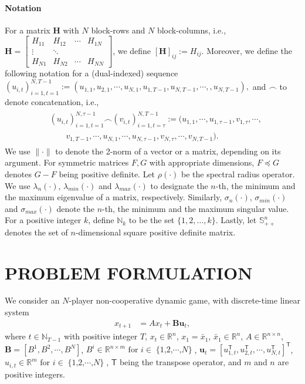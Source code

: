 \documentclass[letterpaper, 10 pt, conference]{ieeeconf}  %
\newcommand{\transpose}{\mathsf{T}}
\DeclareMathOperator{\Nplayers}{\{1,2,\cdots,\textit{N}\}}
\begin{document}
\paragraph*{Notation}
For a matrix $\mathbf{H}$ with $N$ block-rows and $N$ block-columns, i.e.,
    $\mathbf{H} = 
    \begin{bmatrix}
        H_{11} & H_{12} &\cdots & H_{1N}\\
        \vdots& \ddots\\
        H_{N1} & H_{N2} & \cdots &H_{NN}
    \end{bmatrix}$,
we define
    $[\mathbf{H}]_{ij} := H_{ij}$.
Moreover, we define the following notation for a (dual-indexed) sequence
$(u_{i,t})_{i=1,t=1}^{N,T-1} := (u_{1,1},u_{2,1},\cdots,u_{N,1}, u_{1,T-1},u_{N,T-1},\cdots,,u_{N,T-1}),
$
and $\frown$ to denote concatenation, i.e.,
\begin{align*}
    \begin{split}
    &(u_{i,t})_{i=1,t=1}^{N,\tau-1} \frown (v_{i,t})_{i=1,t=\tau}^{N,T-1}:=(u_{1,1},\cdots,u_{1,\tau-1},v_{1,\tau},\cdots,\\
    &\qquad v_{1,T-1},\cdots, u_{N,1},\cdots,u_{N,\tau-1},v_{N,\tau},\cdots,v_{N,T-1} ).
    \end{split}
\end{align*}
We use $\|\cdot\|$ to denote the 2-norm of a vector or a matrix, depending on its argument. For symmetric matrices $F,G$ with appropriate dimensions, $F \preceq G$ denotes $G-F$ being positive definite. Let $\rho(\cdot)$ be the spectral radius operator. We use $\lambda_{n}(\cdot)$, $\lambda_{min}(\cdot)$ and $\lambda_{max}(\cdot)$ to designate the $n$-th, the minimum and the maximum eigenvalue of a matrix, respectively. Similarly, $\sigma_{n}(\cdot)$, $\sigma_{min}(\cdot)$ and $\sigma_{max}(\cdot)$ denote the $n$-th, the minimum and the maximum singular value. For a positive integer $k$, define $\mathbb{N}_k$ to be the set $\{1,2,\dots,k\}$. Lastly, let $\mathbb{S}_{++}^{n}$ denotes the set of $n$-dimensional square positive definite matrix.

\section{PROBLEM FORMULATION}
\label{sec:problem_formulation}

We consider an $N$-player non-cooperative dynamic game, with discrete-time linear system
\begin{align}
    x_{t+1} &= Ax_{t} + \mathbf{B}\mathbf{u}_{t}, \label{eq:linsys}
\end{align}
where $t \in \mathbb{N}_{T-1}$ with positive integer $T$, $x_{t}\in\mathbb{R}^n$, $x_{1} =\bar{x}_{1}$, $\bar{x}_1 \in \mathbb{R}^{n}$, $A \in \mathbb{R}^{n\times n}$, $\mathbf{B} = [B^{1}, B^{2},\cdots,B^{N}]$, $B^{i} \in \mathbb{R}^{n\times m}\text{ for $i\in \Nplayers$}$, $\mathbf{u}_{t} = [u_{1,t}^{\transpose}, u_{2,t}^{\transpose},\cdots,u_{N,t}^{\transpose}]^{\transpose}$, $u_{i,t}\in \mathbb{R}^{m}\text{ for $i\in \Nplayers$}$, $\transpose$ being the transpose operator, and $m$ and $n$ are positive integers.
\end{document}
